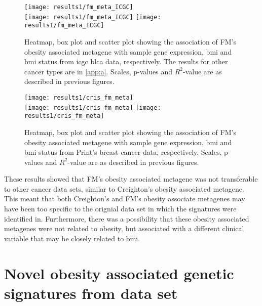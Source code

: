 \begin{figure}[htp!]
	\centering
	\texttt{[image: results1/fm\_meta\_ICGC]}\\
	\vspace{1em}
	\texttt{[image: results1/fm\_meta\_ICGC]}
	\hfill
	\texttt{[image: results1/fm\_meta\_ICGC]}
	\caption[FM's metagene in \acrshort{icgc} \acrshort{blca} data]{Heatmap, box plot and scatter plot showing the association of FM's obesity associated metagene with sample gene expression, \gls{bmi} and \gls{bmi} status from \acrshort{icgc} \acrshort{blca} data, respectively.
	The results for other cancer types are in \cref{app:a}.
	Scales, p-values and $R^2$-value are as described in previous figures.}
	\label{fig:fmmetaicgc}
\end{figure}

\begin{figure}[htp!]
	\centering
	\texttt{[image: results1/cris\_fm\_meta]}\\
	\vspace{1em}
	\texttt{[image: results1/cris\_fm\_meta]}
	\hfill
	\texttt{[image: results1/cris\_fm\_meta]}
	\caption[FM's metagene in Print's breast cancer data]{Heatmap, box plot and scatter plot showing the association of FM's obesity associated metagene with sample gene expression, \gls{bmi} and \gls{bmi} status from Print's breast cancer data, respectively.
	Scales, p-values and $R^2$-value are as described in previous figures.}
	\label{fig:fmmetacris}
\end{figure}

\noindent
These results showed that FM's obesity associated metagene was not transferable to other cancer data sets, similar to Creighton's obesity associated metagene.
This meant that both Creighton's and FM's obesity associate metagenes may have been too specific to the orignial data set in which the signatures were identified in.
Furthermore, there was a possibility that these obesity associated metagenes were not related to obesity, but associated with a different clinical variable that may be closely related to \gls{bmi}.

\section{Novel obesity associated genetic signatures from \citet{Creighton2012} data set}
\label{sec:creighton_obesity_metagene_new}

